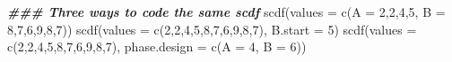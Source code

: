 \documentclass[
]{book}
\newenvironment{Shaded}{\begin{snugshade}}{\end{snugshade}}
\newcommand{\AttributeTok}[1]{\textcolor[rgb]{0.77,0.63,0.00}{#1}}
\newcommand{\DecValTok}[1]{\textcolor[rgb]{0.00,0.00,0.81}{#1}}
\newcommand{\DocumentationTok}[1]{\textcolor[rgb]{0.56,0.35,0.01}{\textbf{\textit{#1}}}}
\newcommand{\FunctionTok}[1]{\textcolor[rgb]{0.00,0.00,0.00}{#1}}
\newcommand{\NormalTok}[1]{#1}
\begin{document}
\begin{Shaded}
\begin{Highlighting}[]
\DocumentationTok{\#\#\# Three ways to code the same scdf}
\FunctionTok{scdf}\NormalTok{(}\AttributeTok{values =} \FunctionTok{c}\NormalTok{(}\AttributeTok{A =} \DecValTok{2}\NormalTok{,}\DecValTok{2}\NormalTok{,}\DecValTok{4}\NormalTok{,}\DecValTok{5}\NormalTok{, }\AttributeTok{B =} \DecValTok{8}\NormalTok{,}\DecValTok{7}\NormalTok{,}\DecValTok{6}\NormalTok{,}\DecValTok{9}\NormalTok{,}\DecValTok{8}\NormalTok{,}\DecValTok{7}\NormalTok{))}
\FunctionTok{scdf}\NormalTok{(}\AttributeTok{values =} \FunctionTok{c}\NormalTok{(}\DecValTok{2}\NormalTok{,}\DecValTok{2}\NormalTok{,}\DecValTok{4}\NormalTok{,}\DecValTok{5}\NormalTok{,}\DecValTok{8}\NormalTok{,}\DecValTok{7}\NormalTok{,}\DecValTok{6}\NormalTok{,}\DecValTok{9}\NormalTok{,}\DecValTok{8}\NormalTok{,}\DecValTok{7}\NormalTok{), }\AttributeTok{B.start =} \DecValTok{5}\NormalTok{)}
\FunctionTok{scdf}\NormalTok{(}\AttributeTok{values =} \FunctionTok{c}\NormalTok{(}\DecValTok{2}\NormalTok{,}\DecValTok{2}\NormalTok{,}\DecValTok{4}\NormalTok{,}\DecValTok{5}\NormalTok{,}\DecValTok{8}\NormalTok{,}\DecValTok{7}\NormalTok{,}\DecValTok{6}\NormalTok{,}\DecValTok{9}\NormalTok{,}\DecValTok{8}\NormalTok{,}\DecValTok{7}\NormalTok{), }\AttributeTok{phase.design =} \FunctionTok{c}\NormalTok{(}\AttributeTok{A =} \DecValTok{4}\NormalTok{, }\AttributeTok{B =} \DecValTok{6}\NormalTok{))}
\end{Highlighting}
\end{Shaded}
\end{document}
